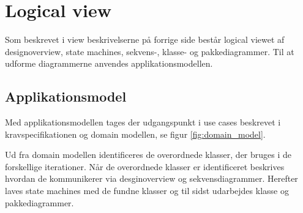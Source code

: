 \section{Logical view}

Som beskrevet i view beskrivelserne på forrige side består logical viewet af designoverview, state machines, sekvens-, klasse- og pakkediagrammer. Til at udforme diagrammerne anvendes applikationsmodellen.

\subsection{Applikationsmodel}
Med applikationsmodellen tages der udgangspunkt i use cases beskrevet i kravspecifikationen og domain modellen, se figur \ref{fig:domain_model}.
  
Ud fra domain modellen identificeres de overordnede klasser, der bruges i de forskellige iterationer. Når de overordnede klasser er identificeret beskrives hvordan de kommunikerer via desginoverview og sekvensdiagrammer. Herefter laves state machines med de fundne klasser og til sidst udarbejdes klasse og pakkediagrammer.

\newpage


\newpage


\newpage


\newpage
